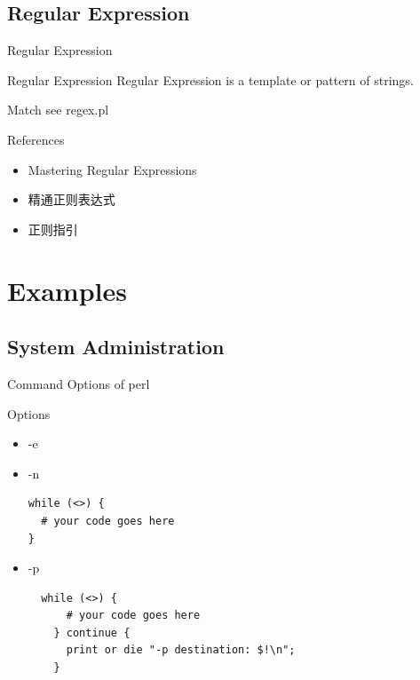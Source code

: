 \documentclass[UTF8]{beamer}
\begin{document}
\subsection{Regular Expression}

\begin{frame}[t]{Regular Expression}
\begin{block}{Regular Expression}
  Regular Expression is a template or pattern of strings.
\end{block}
\end{frame}

\begin{frame}[t]{Match}
  see regex.pl
\end{frame}

\begin{frame}[t]{References}
  \begin{itemize}
    \item Mastering Regular Expressions
    \item 精通正则表达式
    \item 正则指引
  \end{itemize}
\end{frame}


\section{Examples}

\subsection{System Administration}

\begin{frame}[fragile]{Command Options of perl}
\begin{block}{Options}
  \begin{itemize}
    \item -e
    \item -n
    \begin{verbatim}
while (<>) {
  # your code goes here
}
    \end{verbatim}
    \item -p
\begin{verbatim}
  while (<>) {
      # your code goes here
    } continue {
      print or die "-p destination: $!\n";
    }
\end{verbatim}
  \end{itemize}
\end{block}
\end{frame}
\end{document}
